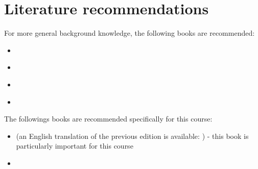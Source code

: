 \documentclass[../skript.tex]{subfiles}
\begin{document}
\section*{Literature recommendations}
For more general background knowledge, the following books are recommended:
\begin{itemize}
\item \cite{AltNO} %
\item \cite{UlbrichUlbrich} %
\item \cite{Evans} %
\item \cite{Ciarlet} %
\end{itemize}
The followings books are recommended specifically for this course:
\begin{itemize}
\item \cite{Troeltzsch} (an English translation of the previous edition is available: \cite{TroeltzschEN}) - this book is particularly important for this course %
\item \cite{HinzePinnauUlbrich} %
\end{itemize}
\end{document}
